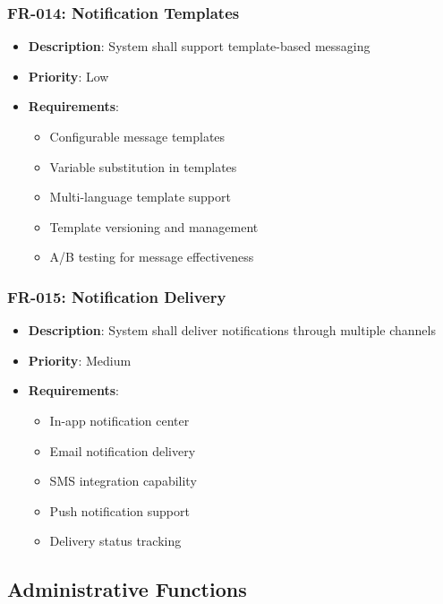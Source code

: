 \documentclass[12pt,a4paper]{article}
\begin{document}
\subsubsection{FR-014: Notification Templates}
\begin{itemize}
    \item \textbf{Description}: System shall support template-based messaging
    \item \textbf{Priority}: Low
    \item \textbf{Requirements}:
    \begin{itemize}
        \item Configurable message templates
        \item Variable substitution in templates
        \item Multi-language template support
        \item Template versioning and management
        \item A/B testing for message effectiveness
    \end{itemize}
\end{itemize}

\subsubsection{FR-015: Notification Delivery}
\begin{itemize}
    \item \textbf{Description}: System shall deliver notifications through multiple channels
    \item \textbf{Priority}: Medium
    \item \textbf{Requirements}:
    \begin{itemize}
        \item In-app notification center
        \item Email notification delivery
        \item SMS integration capability
        \item Push notification support
        \item Delivery status tracking
    \end{itemize}
\end{itemize}

\subsection{Administrative Functions}
\end{document}
